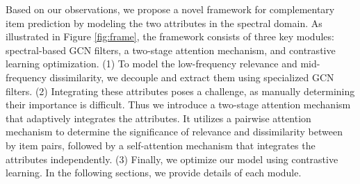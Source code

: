 \documentclass[letterpaper]{article} %
\begin{document}
\label{sec:overview}
Based on our observations, we propose a novel framework for complementary item prediction by modeling the two attributes in the spectral domain. As illustrated in Figure \ref{fig:frame}, the framework consists of three key modules: spectral-based GCN filters, a two-stage attention mechanism, and contrastive learning optimization. (1) To model the low-frequency relevance and mid-frequency dissimilarity, we decouple and extract them using specialized GCN filters. (2) Integrating these attributes poses a challenge, as manually determining their importance is difficult. Thus we introduce a two-stage attention mechanism that adaptively integrates the attributes. It utilizes a pairwise attention mechanism to determine the significance of relevance and dissimilarity between by item pairs, followed by a self-attention mechanism that integrates the attributes independently. (3) Finally, we optimize our model using contrastive learning. In the following sections, we provide details of each module.
\end{document}
